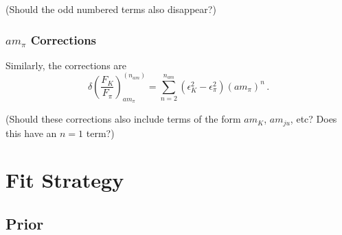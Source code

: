 \documentclass[prd,tightenlines,preprintnumbers,showpacs,superscriptaddress,notitlepage,nofootinbib,eqsecnum,floatfix,notitlepage]{revtex4-1}
\begin{document}
(Should the odd numbered terms also disappear?)

\subsubsection{$am_\pi$ Corrections}
Similarly, the corrections are 
\begin{equation}
\delta\left(\frac{F_K}{F_\pi}\right)_{am_\pi}^{(n_{am})} = \sum_{n=2}^{n_{am}} (\epsilon_K^2 - \epsilon_\pi^2) (am_\pi)^n \, .
\end{equation}

(Should these corrections also include terms of the form $am_K$, $am_{ju}$, etc? Does this have an $n=1$ term?)



\section{Fit Strategy}

\subsection{Prior}




\end{document}
